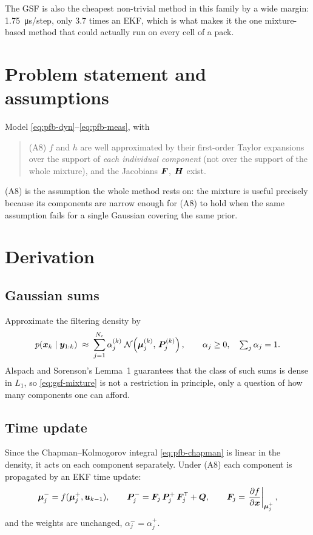 The GSF is also the cheapest non-trivial method in this family by a wide margin:
\SI{1.75}{\micro\second}/step, only \num{3.7} times an EKF, which is what makes it the one
mixture-based method that could actually run on every cell of a pack.

\section{Problem statement and assumptions}
Model \eqref{eq:pfb-dyn}--\eqref{eq:pfb-meas}, with
\begin{quote}
(A8) $f$ and $h$ are well approximated by their first-order Taylor expansions over the support of
\emph{each individual component} (not over the support of the whole mixture), and the Jacobians
$\bm{F}$, $\bm{H}$ exist.
\end{quote}
(A8) is the assumption the whole method rests on: the mixture is useful precisely because its
components are narrow enough for (A8) to hold when the same assumption fails for a single Gaussian
covering the same prior.

\section{Derivation}

\subsection{Gaussian sums}
Approximate the filtering density by
\begin{equation}
  p(\bm{x}_k\mid\bm{y}_{1:k}) \;\approx\; \sum_{j=1}^{N_c} \alpha_j^{(k)}\; \mathcal{N}\!\left(\bm\mu_j^{(k)},\,\bm{P}_j^{(k)}\right),
  \qquad \alpha_j \ge 0, \quad \textstyle\sum_j\alpha_j = 1 .
  \label{eq:gsf-mixture}
\end{equation}
Alspach and Sorenson's Lemma~1 \cite{alspach1972gsf} guarantees that the class of such sums is dense
in $L_1$, so \eqref{eq:gsf-mixture} is not a restriction in principle, only a question of how many
components one can afford.

\subsection{Time update}
Since the Chapman--Kolmogorov integral \eqref{eq:pfb-chapman} is linear in the density, it acts on
each component separately.  Under (A8) each component is propagated by an EKF time update:
\begin{equation}
  \bm\mu_j^- = f(\bm\mu_j^+,\bm{u}_{k-1}), \qquad
  \bm{P}_j^- = \bm{F}_j\,\bm{P}_j^+\,\bm{F}_j^{\mathsf{T}} + \bm{Q}, \qquad
  \bm{F}_j = \left.\frac{\partial f}{\partial\bm{x}}\right|_{\bm\mu_j^+},
  \label{eq:gsf-time}
\end{equation}
and the weights are unchanged, $\alpha_j^- = \alpha_j^+$.

